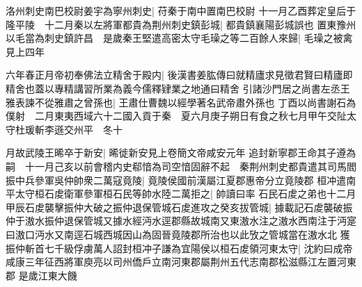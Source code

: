 洛州刺史南巴校尉姜宇為寧州刺史|{
	苻秦于南中置南巴校尉}
十一月乙酉葬定皇后于隆平陵　十二月秦以左將軍都貴為荆州刺史鎮彭城|{
	都貴鎮襄陽彭城誤也}
置東豫州以毛當為刺史鎮許昌　是歲秦王堅遣高密太守毛璪之等二百餘人來歸|{
	毛璪之被禽見上四年}


六年春正月帝初奉佛法立精舍于殿内|{
	後漢書姜肱傳曰就精廬求見徵君賢曰精廬即精舍也蓋以專精講習所業為義今儒釋肄業之地通曰精舍}
引諸沙門居之尚書左丞王雅表諫不從雅肅之曾孫也|{
	王肅仕曹魏以經學著名武帝肅外孫也}
丁酉以尚書謝石為僕射　二月東夷西域六十二國入貢于秦　夏六月庚子朔日有食之秋七月甲午交阯太守杜瑗斬李遜交州平　冬十

月故武陵王晞卒于新安|{
	晞徙新安見上卷簡文帝咸安元年}
追封新寧郡王命其子遵為嗣　十一月己亥以前會稽内史郗愔為司空愔固辭不起　秦荆州刺史都貴遣其司馬閻振中兵參軍吳仲帥衆二萬寇竟陵|{
	竟陵侯國前漢屬江夏郡惠帝分立竟陵郡}
桓冲遣南平太守桓石䖍衛軍參軍桓石民等帥水陸二萬拒之|{
	帥讀曰率}
石民石䖍之弟也十二月甲辰石䖍襲擊振仲大破之振仲退保管城石䖍進攻之癸亥拔管城|{
	據載記石䖍襲破振仲于滶水振仲退保管城又據水經沔水逕郡縣故城南又東滶水注之滶水西南注于沔寔曰滶口沔水又南逕石城西城因山為固晉竟陵郡所治也以此攷之管城當在滶水北}
獲振仲斬首七千級俘虜萬人詔封桓冲子謙為宜陽侯以桓石䖍領河東太守|{
	沈約曰成帝咸康三年征西將軍庾亮以司州僑戶立南河東郡屬荆州五代志南郡松滋縣江左置河東郡}
是歲江東大饑

